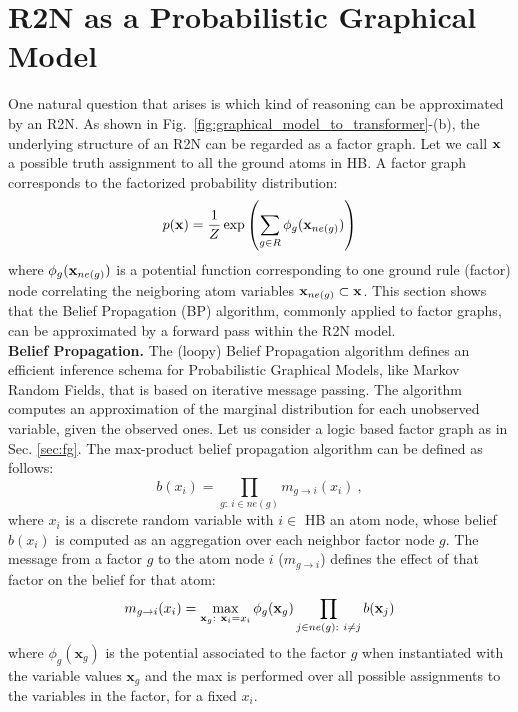 \documentclass[journal]{IEEEtran}
\begin{document}
\section{R2N as a Probabilistic Graphical Model}
\label{sec:bp}
One natural question that arises is which kind of reasoning can be approximated by an R2N.
As shown in Fig.~\ref{fig:graphical_model_to_transformer}-(b), the underlying structure of an R2N can be regarded as a factor graph. Let we call ${\bf x}$ a possible truth assignment to all the ground atoms in HB. A factor graph corresponds to the factorized probability distribution:
\[
p({\bf x}) = \frac{1}{Z} \exp\left( \sum_{g \in R} \phi_g({\bf x}_{ne(g)}) \right)
\]
where $\phi_g({\bf x}_{ne(g)})$ is a potential function corresponding to one ground rule (factor) node correlating the neigboring atom variables ${\bf x}_{ne(g)} \subset {\bf x}$.
This section shows that the Belief Propagation (BP) algorithm, commonly applied to factor graphs, can be approximated by a forward pass within the R2N model.
\\
{\bf Belief Propagation. }
The (loopy) Belief Propagation algorithm defines an efficient inference schema for Probabilistic Graphical Models, like Markov Random Fields, that is based on iterative message passing. The algorithm computes an approximation of the marginal distribution for each unobserved variable, given the observed ones.
Let us consider a logic based factor graph as in Sec. \ref{sec:fg}.
The max-product belief propagation algorithm can be defined as follows: 
\[
b(x_i) = \displaystyle\prod_{g:\ i \in ne(g)} m_{g\rightarrow i}(x_i) \ ,
\]
where $x_i$ is a discrete random variable with $i\in$ HB an atom node, whose belief $b(x_i)$ is computed as an aggregation over each neighbor factor node $g$.
The message from a factor $g$ to the atom node $i$ ($m_{g\rightarrow i}$) defines the effect of that factor on the belief for that atom:
\[
m_{g\rightarrow i}(x_i) = \max_{\mathbf{x}_g:\  \mathbf{x}_{i}=x_i} \phi_g(\mathbf{x}_g) \displaystyle\prod_{j \in ne(g):\ i \ne j} b({\bf x}_j) 
\]
where $\phi_g(\mathbf{x}_g)$ is the potential associated to the factor $g$ when instantiated with the variable values $\mathbf{x}_g$ and the max is performed over all possible assignments to the variables in the factor, for a fixed $x_i$.
\end{document}
